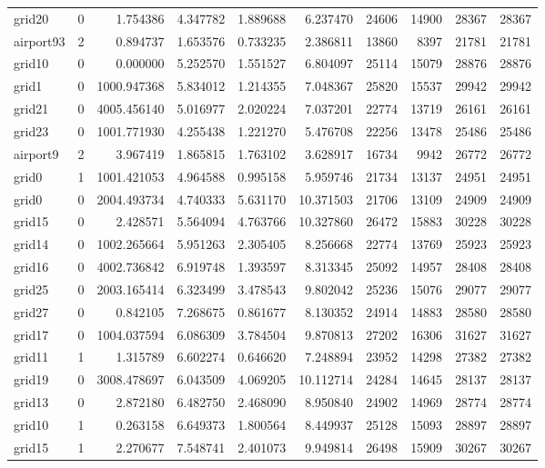 \begin{longtable}{|l|r|r|r|r|r|r|r|r|r|}
grid20 & 0 & 1.754386 & 4.347782 & 1.889688 & 6.237470 & 24606 & 14900 & 28367 & 28367 \\
airport93 & 2 & 0.894737 & 1.653576 & 0.733235 & 2.386811 & 13860 & 8397 & 21781 & 21781 \\
grid10 & 0 & 0.000000 & 5.252570 & 1.551527 & 6.804097 & 25114 & 15079 & 28876 & 28876 \\
grid1 & 0 & 1000.947368 & 5.834012 & 1.214355 & 7.048367 & 25820 & 15537 & 29942 & 29942 \\
grid21 & 0 & 4005.456140 & 5.016977 & 2.020224 & 7.037201 & 22774 & 13719 & 26161 & 26161 \\
grid23 & 0 & 1001.771930 & 4.255438 & 1.221270 & 5.476708 & 22256 & 13478 & 25486 & 25486 \\
airport9 & 2 & 3.967419 & 1.865815 & 1.763102 & 3.628917 & 16734 & 9942 & 26772 & 26772 \\
grid0 & 1 & 1001.421053 & 4.964588 & 0.995158 & 5.959746 & 21734 & 13137 & 24951 & 24951 \\
grid0 & 0 & 2004.493734 & 4.740333 & 5.631170 & 10.371503 & 21706 & 13109 & 24909 & 24909 \\
grid15 & 0 & 2.428571 & 5.564094 & 4.763766 & 10.327860 & 26472 & 15883 & 30228 & 30228 \\
grid14 & 0 & 1002.265664 & 5.951263 & 2.305405 & 8.256668 & 22774 & 13769 & 25923 & 25923 \\
grid16 & 0 & 4002.736842 & 6.919748 & 1.393597 & 8.313345 & 25092 & 14957 & 28408 & 28408 \\
grid25 & 0 & 2003.165414 & 6.323499 & 3.478543 & 9.802042 & 25236 & 15076 & 29077 & 29077 \\
grid27 & 0 & 0.842105 & 7.268675 & 0.861677 & 8.130352 & 24914 & 14883 & 28580 & 28580 \\
grid17 & 0 & 1004.037594 & 6.086309 & 3.784504 & 9.870813 & 27202 & 16306 & 31627 & 31627 \\
grid11 & 1 & 1.315789 & 6.602274 & 0.646620 & 7.248894 & 23952 & 14298 & 27382 & 27382 \\
grid19 & 0 & 3008.478697 & 6.043509 & 4.069205 & 10.112714 & 24284 & 14645 & 28137 & 28137 \\
grid13 & 0 & 2.872180 & 6.482750 & 2.468090 & 8.950840 & 24902 & 14969 & 28774 & 28774 \\
grid10 & 1 & 0.263158 & 6.649373 & 1.800564 & 8.449937 & 25128 & 15093 & 28897 & 28897 \\
grid15 & 1 & 2.270677 & 7.548741 & 2.401073 & 9.949814 & 26498 & 15909 & 30267 & 30267 \\

\end{longtable}
